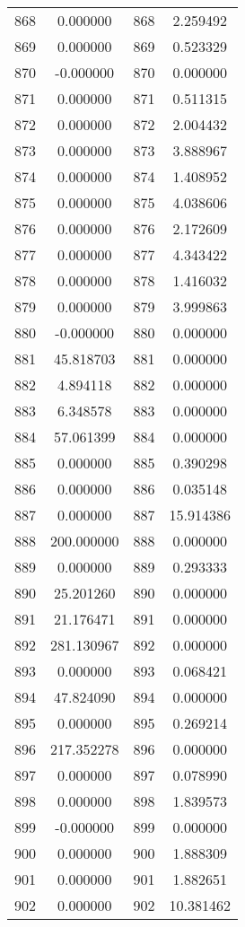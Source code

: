 \documentclass[12pt]{article}
\begin{document}
\begin{longtable}{@{}cccc@{}}
868 & 0.000000 & 868 & 2.259492 \\
869 & 0.000000 & 869 & 0.523329 \\
870 & -0.000000 & 870 & 0.000000 \\
871 & 0.000000 & 871 & 0.511315 \\
872 & 0.000000 & 872 & 2.004432 \\
873 & 0.000000 & 873 & 3.888967 \\
874 & 0.000000 & 874 & 1.408952 \\
875 & 0.000000 & 875 & 4.038606 \\
876 & 0.000000 & 876 & 2.172609 \\
877 & 0.000000 & 877 & 4.343422 \\
878 & 0.000000 & 878 & 1.416032 \\
879 & 0.000000 & 879 & 3.999863 \\
880 & -0.000000 & 880 & 0.000000 \\
881 & 45.818703 & 881 & 0.000000 \\
882 & 4.894118 & 882 & 0.000000 \\
883 & 6.348578 & 883 & 0.000000 \\
884 & 57.061399 & 884 & 0.000000 \\
885 & 0.000000 & 885 & 0.390298 \\
886 & 0.000000 & 886 & 0.035148 \\
887 & 0.000000 & 887 & 15.914386 \\
888 & 200.000000 & 888 & 0.000000 \\
889 & 0.000000 & 889 & 0.293333 \\
890 & 25.201260 & 890 & 0.000000 \\
891 & 21.176471 & 891 & 0.000000 \\
892 & 281.130967 & 892 & 0.000000 \\
893 & 0.000000 & 893 & 0.068421 \\
894 & 47.824090 & 894 & 0.000000 \\
895 & 0.000000 & 895 & 0.269214 \\
896 & 217.352278 & 896 & 0.000000 \\
897 & 0.000000 & 897 & 0.078990 \\
898 & 0.000000 & 898 & 1.839573 \\
899 & -0.000000 & 899 & 0.000000 \\
900 & 0.000000 & 900 & 1.888309 \\
901 & 0.000000 & 901 & 1.882651 \\
902 & 0.000000 & 902 & 10.381462 \\

\end{longtable}
\end{document}
